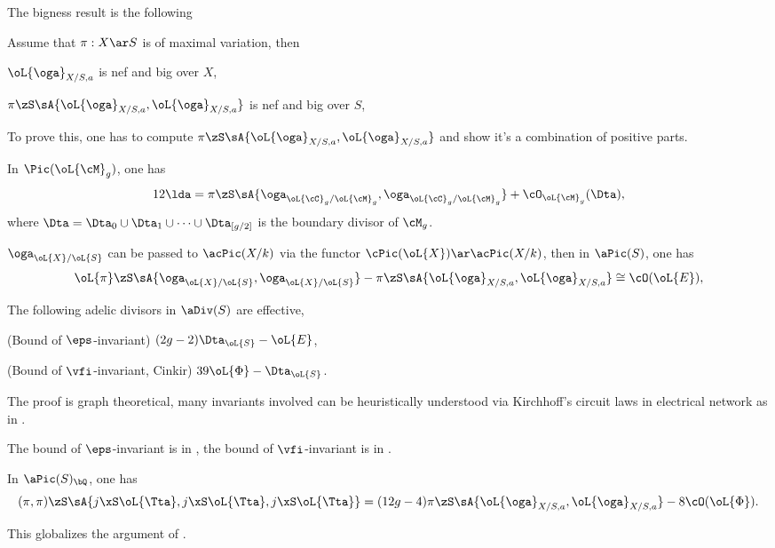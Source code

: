\documentclass[article, a4paper, twoside]{universal}
\begin{document}
The bigness result is the following
\begin{thm}
	Assume that $\pi:X\ar S$ is of maximal variation, then
	\begin{enr}
		\item $\oL{\oga}_{X/S,a}$ is nef and big over $X$,
		\item $\pi\zS\sA{\oL{\oga}_{X/S,a},\oL{\oga}_{X/S,a}}$ is nef and big over $S$,
	\end{enr}
\end{thm}


To prove this, one has to compute $\pi\zS\sA{\oL{\oga}_{X/S,a},\oL{\oga}_{X/S,a}}$ and show it's a combination of positive parts.

\begin{enr}
	\item {}
	\begin{thm}
		In $\Pic(\oL{\cM}_{g})$, one has
		\[
			12\lda=\pi\zS\sA{\oga_{\oL{\cC}_{g}/\oL{\cM}_{g}},\oga_{\oL{\cC}_{g}/\oL{\cM}_{g}}}+\cO_{\oL{\cM}_{g}}(\Dta),
		\]
		where $\Dta=\Dta_{0}\cup\Dta_{1}\cup\cdots\cup\Dta_{[g/2]}$ is the boundary divisor of $\cM_{g}$.
	\end{thm}
	\item {}
	\begin{thm}
		$\oga_{\oL{X}/\oL{S}}$ can be passed to $\acPic(X/k)$ via the functor $\cPic(\oL{X})\ar\acPic(X/k)$, then in $\aPic(S)$, one has
		\[
			\oL{\pi}\zS\sA{\oga_{\oL{X}/\oL{S}},\oga_{\oL{X}/\oL{S}}}-\pi\zS\sA{\oL{\oga}_{X/S,a},\oL{\oga}_{X/S,a}}\cong\cO(\oL{E}),
		\]
	\end{thm}
	\item {}
	\begin{lem}
		The following adelic divisors in $\aDiv(S)$ are effective,
		\begin{enr}
			\item (Bound of $\eps$-invariant) $(2g-2)\Dta_{\oL{S}}-\oL{E}$,
			\item (Bound of $\vfi$-invariant, Cinkir) $39\oL{\Phi}-\Dta_{\oL{S}}$.
		\end{enr}
	\end{lem}

	\begin{rmk}
		The proof is graph theoretical, many invariants involved can be heuristically understood via Kirchhoff's circuit laws in electrical network as in \cite{BF2006Graph}.

		The bound of $\eps$-invariant is in \cite{BF2006Graph}, the bound of $\vfi$-invariant is in \cite[Theorem~2.11]{Cinkir2011}.
	\end{rmk}
	\item {}
	\begin{thm}
		In $\aPic(S)_{\bQ}$, one has
		\[
			(\pi,\pi)\zS\sA{j\xS\oL{\Tta},j\xS\oL{\Tta},j\xS\oL{\Tta}}=(12g-4)\pi\zS\sA{\oL{\oga}_{X/S,a},\oL{\oga}_{X/S,a}}-8\cO(\oL{\Phi}).
		\]
	\end{thm}
	\begin{rmk}
		This globalizes the argument of \cite[Theorem~8.1]{deJong2018}.
	\end{rmk}
\end{enr}
\end{document}
